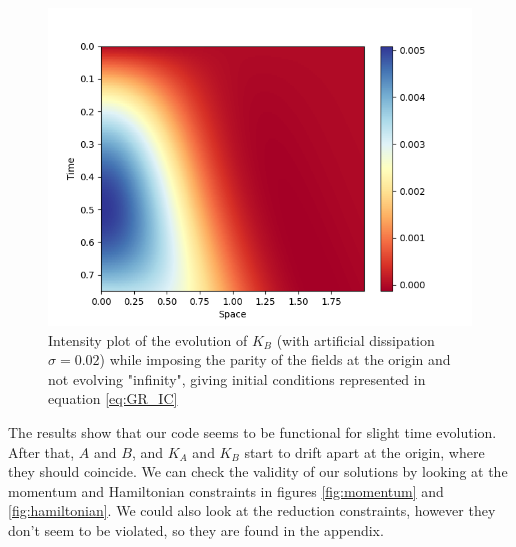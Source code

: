 \begin{figure}[t!]
    \centering
    \includegraphics[width=\columnwidth]{Images/adm_evolution-2nd_order-KB.png}
    \caption{Intensity plot of the evolution of $K_B$ (with artificial dissipation $\sigma = 0.02$) while imposing the parity of the fields at the origin and not evolving "infinity", giving initial conditions represented in equation \eqref{eq:GR_IC}}
    \label{fig:KB}
\end{figure}

The results show that our code seems to be functional for slight time evolution. After that, $A$ and $B$, and $K_A$ and $K_B$ start to drift apart at the origin, where they should coincide. We can check the validity of our solutions by looking at the momentum and Hamiltonian constraints in figures \ref{fig:momentum} and \ref{fig:hamiltonian}. We could also look at the reduction constraints, however they don't seem to be violated, so they are found in the appendix.

